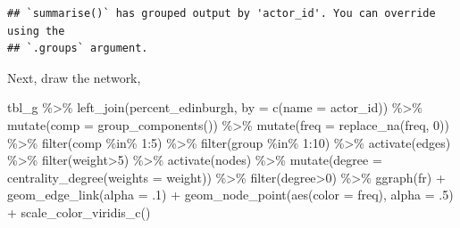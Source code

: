 \documentclass[
]{book}
\newenvironment{Shaded}{\begin{snugshade}}{\end{snugshade}}
\newcommand{\AttributeTok}[1]{\textcolor[rgb]{0.77,0.63,0.00}{#1}}
\newcommand{\DecValTok}[1]{\textcolor[rgb]{0.00,0.00,0.81}{#1}}
\newcommand{\FunctionTok}[1]{\textcolor[rgb]{0.00,0.00,0.00}{#1}}
\newcommand{\NormalTok}[1]{#1}
\newcommand{\OtherTok}[1]{\textcolor[rgb]{0.56,0.35,0.01}{#1}}
\newcommand{\SpecialCharTok}[1]{\textcolor[rgb]{0.00,0.00,0.00}{#1}}
\newcommand{\StringTok}[1]{\textcolor[rgb]{0.31,0.60,0.02}{#1}}
\begin{document}
\begin{verbatim}
## `summarise()` has grouped output by 'actor_id'. You can override using the
## `.groups` argument.
\end{verbatim}

Next, draw the network,

\begin{Shaded}
\begin{Highlighting}[]
\NormalTok{tbl\_g }\SpecialCharTok{\%\textgreater{}\%} 
  \FunctionTok{left\_join}\NormalTok{(percent\_edinburgh, }\AttributeTok{by =} \FunctionTok{c}\NormalTok{(}\StringTok{\textquotesingle{}name\textquotesingle{}} \OtherTok{=} \StringTok{\textquotesingle{}actor\_id\textquotesingle{}}\NormalTok{)) }\SpecialCharTok{\%\textgreater{}\%} 
  \FunctionTok{mutate}\NormalTok{(}\AttributeTok{comp  =} \FunctionTok{group\_components}\NormalTok{()) }\SpecialCharTok{\%\textgreater{}\%} 
  \FunctionTok{mutate}\NormalTok{(}\AttributeTok{freq =} \FunctionTok{replace\_na}\NormalTok{(freq, }\DecValTok{0}\NormalTok{)) }\SpecialCharTok{\%\textgreater{}\%} 
  \FunctionTok{filter}\NormalTok{(comp }\SpecialCharTok{\%in\%} \DecValTok{1}\SpecialCharTok{:}\DecValTok{5}\NormalTok{) }\SpecialCharTok{\%\textgreater{}\%} 
  \FunctionTok{filter}\NormalTok{(group }\SpecialCharTok{\%in\%} \DecValTok{1}\SpecialCharTok{:}\DecValTok{10}\NormalTok{) }\SpecialCharTok{\%\textgreater{}\%} \FunctionTok{activate}\NormalTok{(edges) }\SpecialCharTok{\%\textgreater{}\%} 
  \FunctionTok{filter}\NormalTok{(weight}\SpecialCharTok{\textgreater{}}\DecValTok{5}\NormalTok{) }\SpecialCharTok{\%\textgreater{}\%} 
  \FunctionTok{activate}\NormalTok{(nodes) }\SpecialCharTok{\%\textgreater{}\%} 
  \FunctionTok{mutate}\NormalTok{(}\AttributeTok{degree =} \FunctionTok{centrality\_degree}\NormalTok{(}\AttributeTok{weights =}\NormalTok{ weight)) }\SpecialCharTok{\%\textgreater{}\%} 
  \FunctionTok{filter}\NormalTok{(degree}\SpecialCharTok{\textgreater{}}\DecValTok{0}\NormalTok{) }\SpecialCharTok{\%\textgreater{}\%} 
  \FunctionTok{ggraph}\NormalTok{(}\StringTok{\textquotesingle{}fr\textquotesingle{}}\NormalTok{) }\SpecialCharTok{+} 
  \FunctionTok{geom\_edge\_link}\NormalTok{(}\AttributeTok{alpha =}\NormalTok{ .}\DecValTok{1}\NormalTok{) }\SpecialCharTok{+} 
  \FunctionTok{geom\_node\_point}\NormalTok{(}\FunctionTok{aes}\NormalTok{(}\AttributeTok{color =}\NormalTok{ freq), }\AttributeTok{alpha =}\NormalTok{ .}\DecValTok{5}\NormalTok{) }\SpecialCharTok{+} 
  \FunctionTok{scale\_color\_viridis\_c}\NormalTok{()}
\end{Highlighting}
\end{Shaded}
\end{document}
